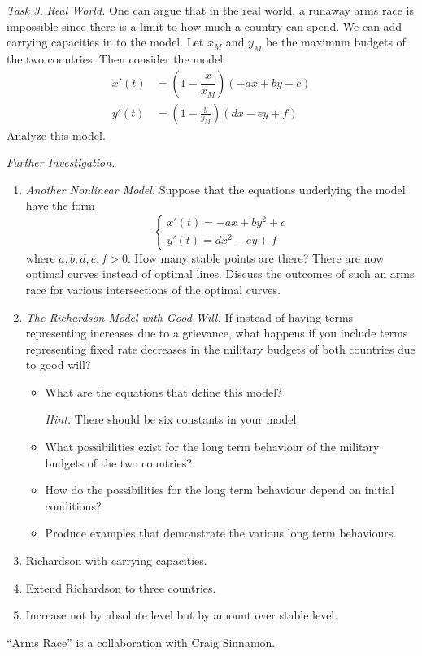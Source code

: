 \emph{Task 3.} \emph{Real World.}
	One can argue that in the real world, a runaway arms race is impossible since there is a limit to how much a country can spend. We can add carrying capacities in to the model. Let $x_M$ and $y_M$ be the maximum budgets of the two countries. Then consider the model
\begin{align*}
x'(t) &= \left(1- \dfrac{x}{x_M}\right) (-ax + by + c)\\
y'(t) &=\left(1-\frac{y}{y_M}\right)(dx-ey+f)
\end{align*}
Analyze this model.


\emph{Further Investigation.}
\begin{enumerate}[label=\emph{\arabic*.}]
\item \emph{Another Nonlinear Model.} Suppose that the equations underlying the model have the form
$$
\begin{cases}
x'(t) = -ax+by^2+c\\
y'(t) =dx^2-ey+f	
\end{cases}
$$
where $a,b,d,e,f>0$. How many stable points are there? 
There are now optimal curves instead of optimal lines. 
Discuss the outcomes of such an arms race for various intersections of the optimal curves.

\item \emph{The Richardson Model with Good Will.} If instead of having terms representing increases due to a grievance, what happens if you include terms representing fixed rate decreases in the military budgets of both countries due to good will?
\begin{itemize}
\item What are the equations that define this model? 

\emph{Hint.} There should be six constants in your model.

\item What possibilities exist for the long term behaviour of the military budgets of the two countries?
\item How do the possibilities for the long term behaviour depend on initial conditions?
\item Produce examples that demonstrate the various long term behaviours.
\end{itemize}

\item Richardson with carrying capacities.

\item Extend Richardson to three countries.

\item Increase not by absolute level but by amount over stable level.
\end{enumerate}

\vfill

\hfill ``Arms Race'' is a collaboration with Craig Sinnamon.
\begin{noexercises}
\end{noexercises}

